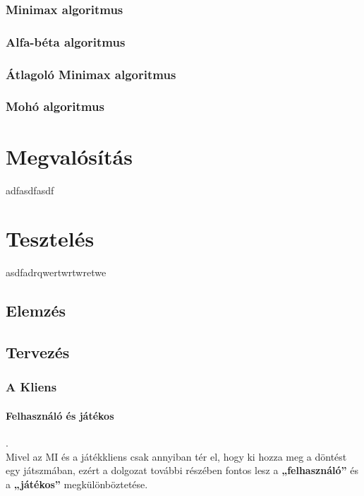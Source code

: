 \documentclass[twoside, a4paper, 12pt]{article}
\begin{document}
\subsubsection{Minimax algoritmus}
\lipsum[1]
\subsubsection{Alfa-béta algoritmus}
\lipsum[1]
\subsubsection{Átlagoló Minimax algoritmus}
\lipsum[1]
\subsubsection{Mohó algoritmus}
\lipsum[1]




\newpage
\section{Megvalósítás}
adfasdfasdf




\newpage
\section{Tesztelés}
asdfadrqwertwrtwretwe



\subsection{Elemzés}
\lipsum[4]

\subsection{Tervezés}



\subsubsection{A Kliens}

\paragraph{Felhasználó és játékos}. \mbox{} \\

Mivel az MI és a játékkliens csak annyiban tér el, hogy ki hozza meg a döntést egy játszmában, ezért a dolgozat további részében fontos lesz a \textbf{„felhasználó”} és a \textbf{„játékos”} megkülönböztetése.
\end{document}

